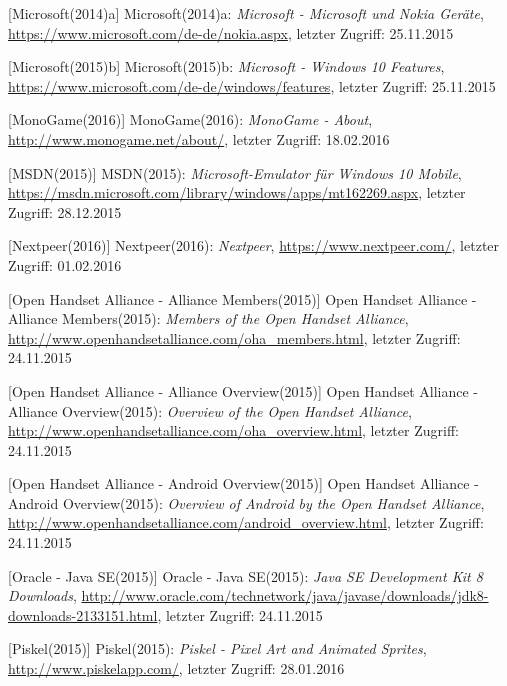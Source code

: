 \begin{thebibliography}{}
[Microsoft(2014)a] Microsoft(2014)a: \emph{Microsoft - Microsoft und Nokia Geräte},
\url{https://www.microsoft.com/de-de/nokia.aspx}, letzter Zugriff: 25.11.2015

[Microsoft(2015)b] Microsoft(2015)b: \emph{Microsoft - Windows 10 Features},
\url{https://www.microsoft.com/de-de/windows/features}, letzter Zugriff: 25.11.2015

[MonoGame(2016)] MonoGame(2016): \emph{MonoGame - About},
\url{http://www.monogame.net/about/}, letzter Zugriff: 18.02.2016

[MSDN(2015)] MSDN(2015): \emph{Microsoft-Emulator für Windows 10 Mobile},
\url{https://msdn.microsoft.com/library/windows/apps/mt162269.aspx}, letzter Zugriff: 28.12.2015

[Nextpeer(2016)] Nextpeer(2016): \emph{Nextpeer},
\url{https://www.nextpeer.com/}, letzter Zugriff: 01.02.2016

[Open Handset Alliance - Alliance Members(2015)] Open Handset Alliance - Alliance Members(2015): \emph{Members of the Open Handset Alliance},
\url{http://www.openhandsetalliance.com/oha_members.html}, letzter Zugriff: 24.11.2015

[Open Handset Alliance - Alliance Overview(2015)] Open Handset Alliance - Alliance Overview(2015): \emph{Overview of the Open Handset Alliance},
\url{http://www.openhandsetalliance.com/oha_overview.html}, letzter Zugriff: 24.11.2015

[Open Handset Alliance - Android Overview(2015)] Open Handset Alliance - Android Overview(2015): \emph{Overview of Android by the Open Handset Alliance},
\url{http://www.openhandsetalliance.com/android_overview.html}, letzter Zugriff: 24.11.2015

[Oracle - Java SE(2015)] Oracle - Java SE(2015): \emph{Java SE Development Kit 8 Downloads},
\url{http://www.oracle.com/technetwork/java/javase/downloads/jdk8-downloads-2133151.html}, letzter Zugriff: 24.11.2015

[Piskel(2015)] Piskel(2015): \emph{Piskel - Pixel Art and Animated Sprites},
\url{http://www.piskelapp.com/}, letzter Zugriff: 28.01.2016


\end{thebibliography}
